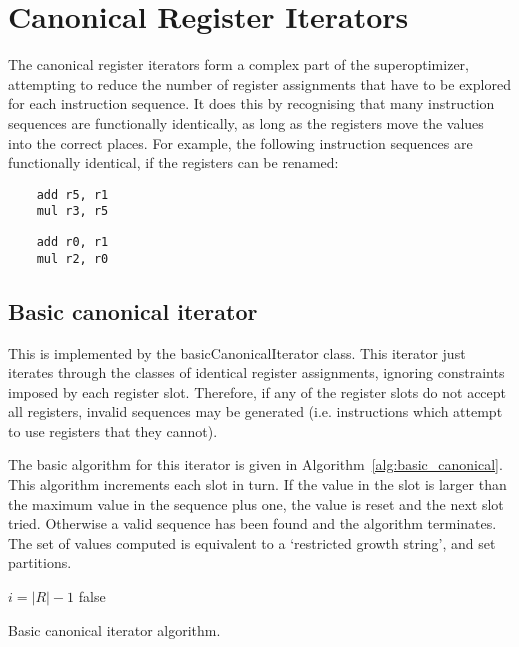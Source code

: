 \documentclass{article}
\begin{document}
\section{Canonical Register Iterators}
The canonical register iterators form a complex part of the superoptimizer, attempting to reduce the number of register assignments that have to be explored for each instruction sequence. It does this by recognising that many instruction sequences are functionally identically, as long as the registers move the values into the correct places. For example, the following instruction sequences are functionally identical, if the registers can be renamed:

\begin{minipage}{0.3\textwidth}
\begin{verbatim}
    add r5, r1
    mul r3, r5
\end{verbatim}
\end{minipage}
\hspace{1cm}
\begin{minipage}{0.3\textwidth}
\begin{verbatim}
    add r0, r1
    mul r2, r0
\end{verbatim}
\end{minipage}

\subsection{Basic canonical iterator}
This is implemented by the basicCanonicalIterator class. This iterator just iterates through the classes of identical register assignments, ignoring constraints imposed by each register slot. Therefore, if any of the register slots do not accept all registers, invalid sequences may be generated (i.e. instructions which attempt to use registers that they cannot).

The basic algorithm for this iterator is given in Algorithm~\ref{alg:basic_canonical}. This algorithm increments each slot in turn. If the value in the slot is larger than the maximum value in the sequence plus one, the value is reset and the next slot tried. Otherwise a valid sequence has been found and the algorithm terminates. The set of values computed is equivalent to a `restricted growth string', and set partitions.
\begin{algorithm}
    $i = |R| - 1$\;
    \Return false\;
\caption{Basic canonical iterator algorithm.}
\label{alg:basic_canonical}
\end{algorithm}
\end{document}
